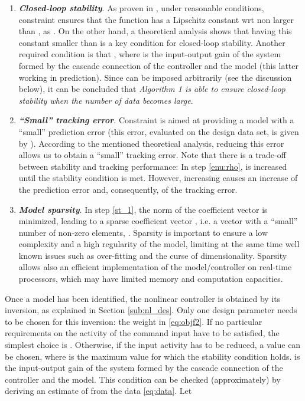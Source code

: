\documentclass[twocolumn,english,journal]{IEEEtran}
\begin{document}
\begin{enumerate}
\item \textbf{\emph{Closed-loop stability}}. As proven in \cite{NoFaMiAUT13},
under reasonable conditions, constraint  ensures that the function
 has a Lipschitz constant wrt 
non larger than , as . On the other
hand, a theoretical analysis shows that having this constant smaller
than  is a key condition for closed-loop stability. Another required
condition is that , where 
is the input-output gain of the system formed by the cascade connection
of the controller and the model (this latter working in prediction).
Since  can be imposed arbitrarily (see the discussion
below), it can be concluded that \emph{Algorithm 1 is able to ensure
closed-loop stability when the number of data becomes large}.\medskip{}

\item \textbf{\emph{``Small'' tracking error}}. Constraint  is aimed
at providing a model with a ``small'' prediction error (this error,
evaluated on the design data set, is given by ).
According to the mentioned theoretical analysis, reducing this error
allows us to obtain a ``small'' tracking error. Note that there is
a trade-off between stability and tracking performance: In step \ref{enu:rho},
 is increased until the stability condition is met. However,
increasing  causes an increase of the prediction error and,
consequently, of the tracking error.\medskip{}

\item \textbf{\emph{Model sparsity}}. In step \ref{st_1}, the 
norm of the coefficient vector  is minimized, leading to a
sparse coefficient vector , i.e. a vector with a ``small\textquotedblright{}
number of non-zero elements, \cite{Fuchs05,Donoho06_2,Candes06_1,Tropp06}.
Sparsity is important to ensure a low complexity and a high regularity
of the model, limiting at the same time well known issues such as
over-fitting and the curse of dimensionality. Sparsity allows also
an efficient implementation of the model/controller on real-time processors,
which may have limited memory and computation capacities.
\end{enumerate}
\hfill{}\medskip{}


Once a model has been identified, the nonlinear controller 
is obtained by its inversion, as explained in Section \ref{sub:nl_des}.
Only one design parameter needs to be chosen for this inversion: the
weight  in \eqref{eq:objf2}. If no particular requirements
on the activity of the command input  have to be satisfied,
the simplest choice is . Otherwise, if the input activity
has to be reduced, a value  can be chosen, where
 is the maximum value for which the stability condition
 holds.  is the input-output
gain of the system formed by the cascade connection of the controller
and the model. This condition can be checked (approximately) by deriving
an estimate  of  from the data \eqref{eq:data}.
Let
\end{document}
